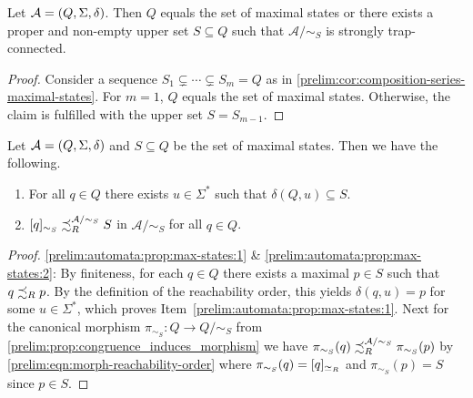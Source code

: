 \begin{corollary}\label{prelim:automata:cor:composition-series-maximal-states}
	Let $\mathcal A = (Q, \Sigma, \delta)$.
	Then $Q$ equals the set of maximal states
	or there exists a proper and non-empty upper set $S \subseteq Q$
	such that $\mathcal A / {\sim_S}$
	is strongly trap-connected.
\end{corollary}
\begin{proof}
	Consider a sequence $S_1 \subsetneq \cdots \subsetneq S_m = Q$ 
	as in \cref{prelim:cor:composition-series-maximal-states}.
	For $m = 1$, $Q$ equals the set of maximal states.
	Otherwise, the claim is fulfilled with 
	the upper set $S = S_{m-1}$.	
\end{proof}

\begin{proposition} \label{prelim:automata:prop:max-states}
   	Let $\mathcal A = (Q, \Sigma, \delta)$ and $S \subseteq Q$ be the set of maximal states.
   	Then we have the following.
   	
   	\begin{enumerate}
   	\item \label{prelim:automata:prop:max-states:1} For all $q \in Q$ there exists $u \in \Sigma^*$ such that $\delta(Q, u) \subseteq S$.
   			
   	\item \label{prelim:automata:prop:max-states:2} $[q]_{\sim_S} \precsim_R^{\mathcal A / {\sim_S}} S$ in $\mathcal A / {\sim_S}$ for all $q \in Q$.
   	\end{enumerate}
\end{proposition}
\begin{proof}
\ref{prelim:automata:prop:max-states:1} \& \ref{prelim:automata:prop:max-states:2}: 
By finiteness, for each $q \in Q$ there exists a maximal $p \in S$
such that $q \precsim_R p$. By the definition of the reachability order,
this yields $\delta(q, u) = p$ for some $u \in \Sigma^*$, which proves Item~\ref{prelim:automata:prop:max-states:1}.
Next for the canonical morphism
$\pi_{\sim_S} \colon Q \to Q / {\sim_S}$  from \cref{prelim:prop:congruence_induces_morphism}
we have $\pi_{\sim_S}(q) \precsim_R^{\mathcal A / {\sim_S}} \pi_{\sim_S}(p)$ by \cref{prelim:eqn:morph-reachability-order}
where $\pi_{\sim_S}(q) = [q]_{\simeq_R}$
and $\pi_{\sim_S}(p) = S$ since $p \in S$.
\end{proof}


